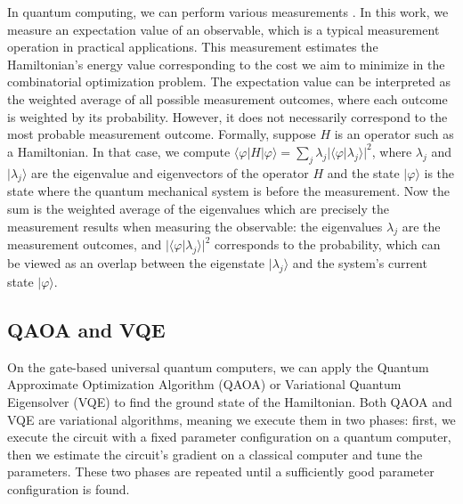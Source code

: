 In quantum computing, we can perform various measurements \cite{Nielsen_Chuang_2010}. In this work, we measure an expectation value of an observable, which is a typical measurement operation in practical applications. This measurement estimates the Hamiltonian's energy value corresponding to the cost we aim to minimize in the combinatorial optimization problem. The expectation value can be interpreted as the weighted average of all possible measurement outcomes, where each outcome is weighted by its probability. However, it does not necessarily correspond to the most probable measurement outcome. Formally, suppose $H$ is an operator such as a Hamiltonian. In that case, we compute $\langle \varphi | H | \varphi \rangle = \sum_{j}\lambda_j |\langle\varphi | \lambda_j\rangle|^2$, where $\lambda_j$ and $|\lambda_j \rangle$ are the eigenvalue and eigenvectors of the operator $H$ and the state $| \varphi \rangle$ is the state where the quantum mechanical system is before the measurement. Now the sum is the weighted average of the eigenvalues which are precisely the measurement results when measuring the observable: the eigenvalues $\lambda_j$ are the measurement outcomes, and $|\langle\varphi | \lambda_j\rangle|^2$ corresponds to the probability, which can be viewed as an overlap between the eigenstate $|\lambda_j \rangle$ and the system's current state $| \varphi \rangle$.

\subsection{QAOA and VQE}

On the gate-based universal quantum computers, we can apply the Quantum Approximate Optimization Algorithm (QAOA) \cite{farhi2014quantum} or Variational Quantum Eigensolver (VQE) \cite{Peruzzo_2014} to find the ground state of the Hamiltonian. Both QAOA and VQE are variational algorithms, meaning we execute them in two phases: first, we execute the circuit with a fixed parameter configuration on a quantum computer, then we estimate the circuit's gradient on a classical computer and tune the parameters. These two phases are repeated until a sufficiently good parameter configuration is found. 

